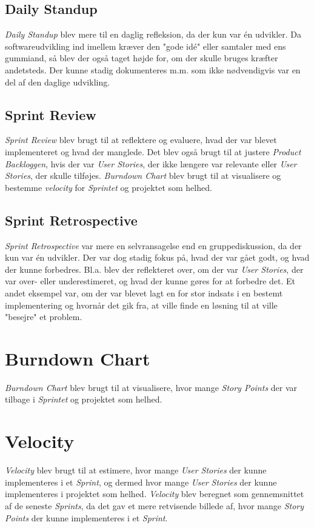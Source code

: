 \subsection{Daily Standup}
\emph{Daily Standup} blev mere til en daglig refleksion, da der kun var én udvikler. Da softwareudvikling ind imellem kræver den "gode idé" eller samtaler med ens gummiand, så blev der også taget højde for, om der skulle bruges kræfter andetsteds.
Der kunne stadig dokumenteres m.m. som ikke nødvendigvis var en del af den daglige udvikling.

\subsection{Sprint Review}
\emph{Sprint Review} blev brugt til at reflektere og evaluere, hvad der var blevet implementeret og hvad der manglede. Det blev også brugt til at justere \emph{Product Backloggen}, hvis der var \emph{User Stories}, der ikke længere var relevante eller \emph{User Stories}, der skulle tilføjes.
\emph{Burndown Chart} blev brugt til at visualisere og bestemme \emph{velocity} for \emph{Sprintet} og projektet som helhed.

\subsection{Sprint Retrospective}
\emph{Sprint Retrospective} var mere en selvransagelse end en gruppediskussion, da der kun var én udvikler. Der var dog stadig fokus på, hvad der var gået godt, og hvad der kunne forbedres. 
Bl.a. blev der reflekteret over, om der var \emph{User Stories}, der var over- eller underestimeret, og hvad der kunne gøres for at forbedre det. 
Et andet eksempel var, om der var blevet lagt en for stor indsats i en bestemt implementering og hvornår det gik fra, at ville finde en løsning til at ville "besejre" et problem.

\section{Burndown Chart}
\emph{Burndown Chart} blev brugt til at visualisere, hvor mange \emph{Story Points} der var tilbage i \emph{Sprintet} og projektet som helhed.

\section{Velocity}
\emph{Velocity} blev brugt til at estimere, hvor mange \emph{User Stories} der kunne implementeres i et \emph{Sprint}, og dermed hvor mange \emph{User Stories} der kunne implementeres i projektet som helhed.
\emph{Velocity} blev beregnet som gennemsnittet af de seneste \emph{Sprints}, da det gav et mere retvisende billede af, hvor mange \emph{Story Points} der kunne implementeres i et \emph{Sprint}.